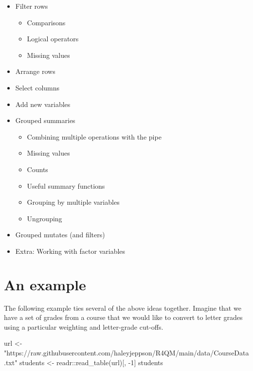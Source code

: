 \documentclass[
]{book}
\newenvironment{Shaded}{\begin{snugshade}}{\end{snugshade}}
\newcommand{\DecValTok}[1]{\textcolor[rgb]{0.00,0.00,0.81}{#1}}
\newcommand{\FunctionTok}[1]{\textcolor[rgb]{0.00,0.00,0.00}{#1}}
\newcommand{\NormalTok}[1]{#1}
\newcommand{\OtherTok}[1]{\textcolor[rgb]{0.56,0.35,0.01}{#1}}
\newcommand{\SpecialCharTok}[1]{\textcolor[rgb]{0.00,0.00,0.00}{#1}}
\newcommand{\StringTok}[1]{\textcolor[rgb]{0.31,0.60,0.02}{#1}}
\providecommand{\tightlist}{%
  \setlength{\itemsep}{0pt}\setlength{\parskip}{0pt}}
\begin{document}
\begin{itemize}
\tightlist
\item
  Filter rows

  \begin{itemize}
  \tightlist
  \item
    Comparisons
  \item
    Logical operators
  \item
    Missing values
  \end{itemize}
\item
  Arrange rows
\item
  Select columns
\item
  Add new variables
\item
  Grouped summaries

  \begin{itemize}
  \tightlist
  \item
    Combining multiple operations with the pipe
  \item
    Missing values
  \item
    Counts
  \item
    Useful summary functions
  \item
    Grouping by multiple variables
  \item
    Ungrouping
  \end{itemize}
\item
  Grouped mutates (and filters)
\item
  Extra: Working with factor variables
\end{itemize}

\hypertarget{an-example-1}{%
\section{An example}\label{an-example-1}}

The following example ties several of the above ideas together. Imagine that we have a set of grades from a course that we would like to convert to letter grades using a particular weighting and letter-grade cut-offs.

\begin{Shaded}
\begin{Highlighting}[]
\NormalTok{url }\OtherTok{\textless{}{-}} \StringTok{"https://raw.githubusercontent.com/haleyjeppson/R4QM/main/data/CourseData.txt"}
\NormalTok{students }\OtherTok{\textless{}{-}}\NormalTok{ readr}\SpecialCharTok{::}\FunctionTok{read\_table}\NormalTok{(url)[, }\SpecialCharTok{{-}}\DecValTok{1}\NormalTok{]}
\NormalTok{students}
\end{Highlighting}
\end{Shaded}
\end{document}
